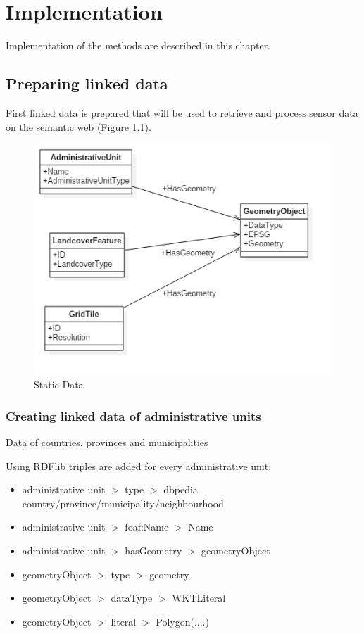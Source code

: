 
\chapter{Implementation}
\label{chap:impl}

Implementation of the methods are described in this chapter.

\section{Preparing linked data}
First linked data is prepared that will be used to retrieve and process sensor data on the semantic web (Figure \ref*{fig:Static}).

\begin{figure}
	\includegraphics[width=0.7\linewidth]{UML/staticdata2.PNG}
	\caption{Static Data}
	\label{fig:Static}
\end{figure}

\subsection{Creating linked data of administrative units}
Data of countries, provinces and municipalities

Using RDFlib triples are added for every administrative unit: 
\begin{itemize}
	\item administrative unit $>$ type $>$ dbpedia country/province/municipality/neighbourhood
	\item administrative unit $>$ foaf:Name $>$ Name
	\item administrative unit $>$ hasGeometry $>$ geometryObject
	\item geometryObject $>$ type $>$ geometry
	\item geometryObject $>$ dataType $>$ WKTLiteral
	\item geometryObject $>$ literal $>$ Polygon(....)
\end{itemize}

